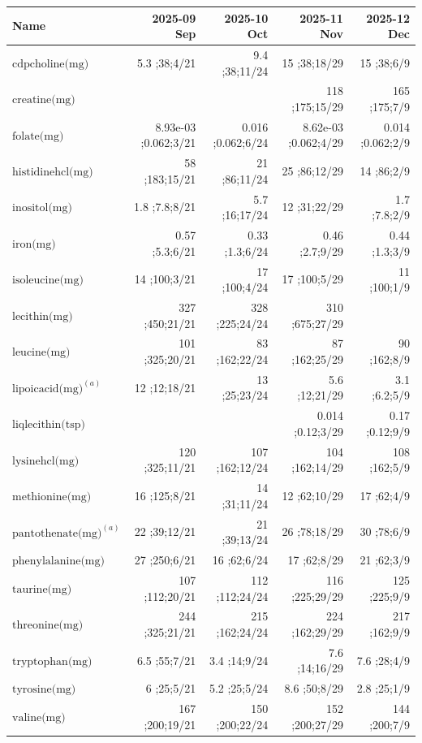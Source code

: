 \begin{table}[H]
\centering
\begin{tabular}{|l|r|r|r|r|}
\hline
Name&2025-09 Sep&2025-10 Oct&2025-11 Nov&2025-12 Dec\\
\hline
$\textrm{cdpcholine(mg)}$&5.3 ;38;4/21&9.4 ;38;11/24&15 ;38;18/29&15 ;38;6/9\\
$\textrm{creatine(mg)}$&&&118 ;175;15/29&165 ;175;7/9\\
$\textrm{folate(mg)}$&8.93e-03 ;0.062;3/21&0.016 ;0.062;6/24&8.62e-03 ;0.062;4/29&0.014 ;0.062;2/9\\
$\textrm{histidinehcl(mg)}$&58 ;183;15/21&21 ;86;11/24&25 ;86;12/29&14 ;86;2/9\\
$\textrm{inositol(mg)}$&1.8 ;7.8;8/21&5.7 ;16;17/24&12 ;31;22/29&1.7 ;7.8;2/9\\
$\textrm{iron(mg)}$&0.57 ;5.3;6/21&0.33 ;1.3;6/24&0.46 ;2.7;9/29&0.44 ;1.3;3/9\\
$\textrm{isoleucine(mg)}$&14 ;100;3/21&17 ;100;4/24&17 ;100;5/29&11 ;100;1/9\\
$\textrm{lecithin(mg)}$&327 ;450;21/21&328 ;225;24/24&310 ;675;27/29&\\
$\textrm{leucine(mg)}$&101 ;325;20/21&83 ;162;22/24&87 ;162;25/29&90 ;162;8/9\\
$\textrm{lipoicacid(mg)}^{\left(a\right)}$&12 ;12;18/21&13 ;25;23/24&5.6 ;12;21/29&3.1 ;6.2;5/9\\
$\textrm{liqlecithin(tsp)}$&&&0.014 ;0.12;3/29&0.17 ;0.12;9/9\\
$\textrm{lysinehcl(mg)}$&120 ;325;11/21&107 ;162;12/24&104 ;162;14/29&108 ;162;5/9\\
$\textrm{methionine(mg)}$&16 ;125;8/21&14 ;31;11/24&12 ;62;10/29&17 ;62;4/9\\
$\textrm{pantothenate(mg)}^{\left(a\right)}$&22 ;39;12/21&21 ;39;13/24&26 ;78;18/29&30 ;78;6/9\\
$\textrm{phenylalanine(mg)}$&27 ;250;6/21&16 ;62;6/24&17 ;62;8/29&21 ;62;3/9\\
$\textrm{taurine(mg)}$&107 ;112;20/21&112 ;112;24/24&116 ;225;29/29&125 ;225;9/9\\
$\textrm{threonine(mg)}$&244 ;325;21/21&215 ;162;24/24&224 ;162;29/29&217 ;162;9/9\\
$\textrm{tryptophan(mg)}$&6.5 ;55;7/21&3.4 ;14;9/24&7.6 ;14;16/29&7.6 ;28;4/9\\
$\textrm{tyrosine(mg)}$&6 ;25;5/21&5.2 ;25;5/24&8.6 ;50;8/29&2.8 ;25;1/9\\
$\textrm{valine(mg)}$&167 ;200;19/21&150 ;200;22/24&152 ;200;27/29&144 ;200;7/9\\

\end{tabular}
\end{table}
